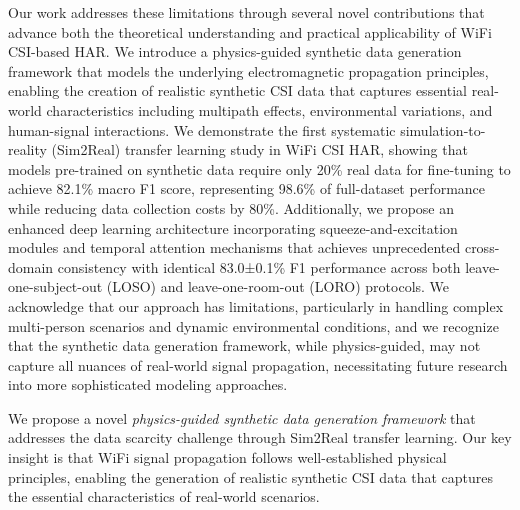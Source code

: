 \documentclass[journal]{IEEEtran}
\begin{document}
Our work addresses these limitations through several novel contributions that advance both the theoretical understanding and practical applicability of WiFi CSI-based HAR. We introduce a physics-guided synthetic data generation framework that models the underlying electromagnetic propagation principles, enabling the creation of realistic synthetic CSI data that captures essential real-world characteristics including multipath effects, environmental variations, and human-signal interactions. We demonstrate the first systematic simulation-to-reality (Sim2Real) transfer learning study in WiFi CSI HAR, showing that models pre-trained on synthetic data require only 20\% real data for fine-tuning to achieve 82.1\% macro F1 score, representing 98.6\% of full-dataset performance while reducing data collection costs by 80\%. Additionally, we propose an enhanced deep learning architecture incorporating squeeze-and-excitation modules and temporal attention mechanisms that achieves unprecedented cross-domain consistency with identical 83.0±0.1\% F1 performance across both leave-one-subject-out (LOSO) and leave-one-room-out (LORO) protocols. We acknowledge that our approach has limitations, particularly in handling complex multi-person scenarios and dynamic environmental conditions, and we recognize that the synthetic data generation framework, while physics-guided, may not capture all nuances of real-world signal propagation, necessitating future research into more sophisticated modeling approaches.



We propose a novel \textit{physics-guided synthetic data generation framework} that addresses the data scarcity challenge through Sim2Real transfer learning. Our key insight is that WiFi signal propagation follows well-established physical principles, enabling the generation of realistic synthetic CSI data that captures the essential characteristics of real-world scenarios.
\end{document}
